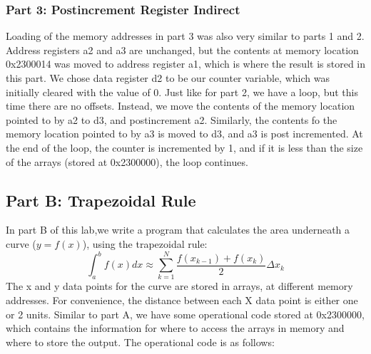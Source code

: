 \documentclass[letterpaper]{article}
\begin{document}
    \subsubsection{Part 3: Postincrement Register Indirect}
    Loading of the memory addresses in part 3 was also very similar to parts 1 and
    2. Address registers a2 and a3 are unchanged, but the  contents at memory
    location 0x2300014 was moved to address register a1, which is where the
    result is stored in this part. We chose data register d2 to be our counter
    variable, which was initially cleared with the value of 0. Just like for
    part 2, we have a loop, but this time there are no offsets. Instead, we move
    the contents of the memory location pointed to by a2 to d3, and
    postincrement a2. Similarly, the contents fo the memory location pointed to
    by a3 is moved to d3, and a3 is post incremented. At the end of the loop,
    the counter is incremented by 1, and if it is less than the size of the
    arrays (stored at 0x2300000), the loop continues.





  \subsection{Part B: Trapezoidal Rule}

    In part B of this lab,we write a program that calculates the area
    underneath a curve ($y=f(x)$), using the trapezoidal rule:
    $$ \int_a^b f(x) dx \approx \sum_{k=1}^{N} \frac{f(x_{k-1})+f(x_k)}{2}\Delta x_k$$
    The x and y data points for the curve are stored in arrays, at different
    memory addresses. For convenience, the distance between each X data point is either one
    or 2 units. Similar to part A, we have some operational code stored at 0x2300000, which contains the
    information for where to access the arrays in memory and where to store the output.
    The operational code is as follows:
\end{document}
